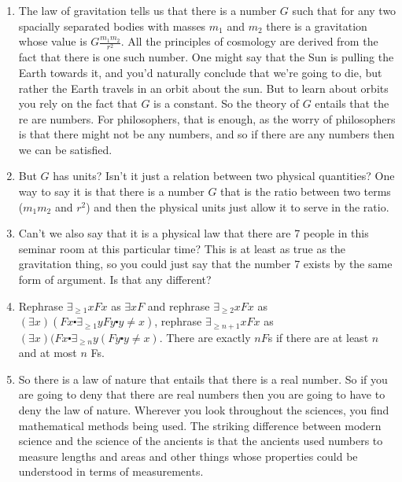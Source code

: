 \documentclass[12pt]{article}
\theoremstyle{definition}
\begin{document}
\begin{enumerate}
    \itemsep0em 
    \item
        The law of gravitation tells us that there is a number $G$ such that
        for any two spacially separated bodies with masses $m_1$ and $m_2$
        there is a gravitation whose value is $G\frac{m_1m_2}{r^2}$. All the
        principles of cosmology are derived from the fact that there is one
        such number. One might say that the Sun is pulling the Earth towards
        it, and you'd naturally conclude that we're going to die, but rather
        the Earth travels in an orbit about the sun. But to learn about orbits
        you rely on the fact that $G$ is a constant. So the theory of $G$
        entails that the re are numbers. For philosophers, that is enough, as
        the worry of philosophers is that there might not be any numbers, and
        so if there are any numbers then we can be satisfied. 
    \item
        But $G$ has units? Isn't it just a relation between two physical
        quantities? One way to say it is that there is a number $G$ that is
        the ratio between two terms ($m_1m_2$ and $r^2$) and then the physical
        units just allow it to serve in the ratio.
	\item
        Can't we also say that it is a physical law that there are 7 people in
        this seminar room at this particular time? This is at least as true as
        the gravitation thing, so you could just say that the number 7 exists
        by the same form of argument. Is that any different?
    \item
        Rephrase $\exists_{\ge 1} xFx$ as $\exists x F$ and rephrase
        $\exists_{\ge 2} x Fx$ as $(\exists x)(Fx \centerdot \exists_{\ge 1} y
        Fy \centerdot y \ne x)$, rephrase $\exists_{\ge n + 1} xFx$ as
        $(\exists x)(Fx \centerdot \exists_{\ge n} y (Fy \centerdot y \ne x)$.
        There are exactly $n F$s if there are at least $n$ and at most $n$ Fs.
    \item
        So there is a law of nature that entails that there is a real number.
        So if you are going to deny that there are real numbers then you are
        going to have to deny the law of nature. Wherever you look throughout
        the sciences, you find mathematical methods being used. The striking
        difference between modern science and the science of the ancients is
        that the ancients used numbers to measure lengths and areas and other
        things whose properties could be understood in terms of measurements.

\end{enumerate}
\end{document}
